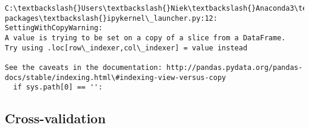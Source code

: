 \documentclass[11pt]{article}
\begin{document}
    \begin{Verbatim}[commandchars=\\\{\}]
C:\textbackslash{}Users\textbackslash{}Niek\textbackslash{}Anaconda3\textbackslash{}lib\textbackslash{}site-packages\textbackslash{}ipykernel\_launcher.py:12: SettingWithCopyWarning: 
A value is trying to be set on a copy of a slice from a DataFrame.
Try using .loc[row\_indexer,col\_indexer] = value instead

See the caveats in the documentation: http://pandas.pydata.org/pandas-docs/stable/indexing.html\#indexing-view-versus-copy
  if sys.path[0] == '':

    \end{Verbatim}

    \subsection{Cross-validation}\label{cross-validation}
\end{document}
